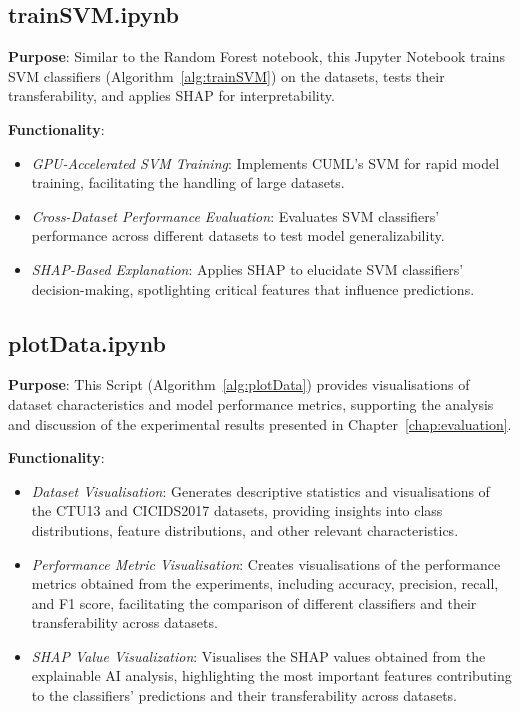 \subsection{trainSVM.ipynb}
\textbf{Purpose}: Similar to the Random Forest notebook, this Jupyter Notebook trains SVM classifiers (Algorithm~\ref{alg:trainSVM}) on the datasets, tests their transferability, and applies SHAP for interpretability.

\textbf{Functionality}:
\begin{itemize}
    \item \textit{GPU-Accelerated SVM Training}: Implements CUML's SVM for rapid model training, facilitating the handling of large datasets.
    \item \textit{Cross-Dataset Performance Evaluation}: Evaluates SVM classifiers' performance across different datasets to test model generalizability.
    \item \textit{SHAP-Based Explanation}: Applies SHAP to elucidate SVM classifiers' decision-making, spotlighting critical features that influence predictions.
\end{itemize}

\subsection{plotData.ipynb}
\textbf{Purpose}: This Script (Algorithm~\ref{alg:plotData}) provides visualisations of dataset characteristics and model performance metrics, supporting the analysis and discussion of the experimental results presented in Chapter~\ref{chap:evaluation}.

\textbf{Functionality}:
\begin{itemize}
    \item \textit{Dataset Visualisation}: Generates descriptive statistics and visualisations of the CTU13 and CICIDS2017 datasets, providing insights into class distributions, feature distributions, and other relevant characteristics.
    \item \textit{Performance Metric Visualisation}: Creates visualisations of the performance metrics obtained from the experiments, including accuracy, precision, recall, and F1 score, facilitating the comparison of different classifiers and their transferability across datasets.
    \item \textit{SHAP Value Visualization}: Visualises the SHAP values obtained from the explainable AI analysis, highlighting the most important features contributing to the classifiers' predictions and their transferability across datasets.
\end{itemize}

